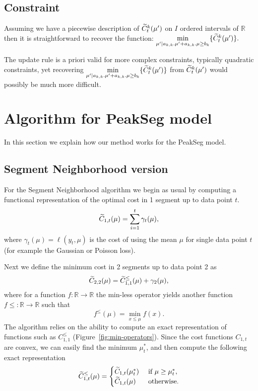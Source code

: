 \documentclass{article}
\newcommand{\RR}{\mathbb R}
\begin{document}
\subsection{Constraint}
Assuming we have a piecewise description of $\widetilde{C}^{k}_{t}(\mu')$ on $I$ ordered intervals of $\mathbb{R}$
then it is straightforward to recover the function:
$\underset{\mu' | a_{k,k}. \mu' + a_{k,k}. \mu  \geq  b_{k}}{\min} \{ \widetilde{C}^{k}_{t}(\mu') \}.$

The update rule is a priori valid for more complex constraints, typically quadratic constraints, yet recovering
$\underset{\mu' | a_{k,k}. \mu' + a_{k,k}. \mu  \geq  b_{k}}{\min} \{ \widetilde{C}^{k}_{t}(\mu') \}$ from $\widetilde{C}^{k}_{t}(\mu')$ would possibly be much more difficult.


\section{Algorithm for PeakSeg model}

In this section we explain how our method works for the PeakSeg model.

\subsection{Segment Neighborhood version}

For the Segment Neighborhood algorithm we begin as usual by computing
a functional representation of the optimal cost in 1 segment up to
data point $t$. 
\begin{equation*}
  \label{eq:C1b}
  \widetilde{C}_{1,t}(\mu) = \sum_{i=1}^t \gamma_t(\mu),
\end{equation*}
where $\gamma_t(\mu)=\ell(y_t, \mu)$ is the cost of using the mean
$\mu$ for single data point $t$ (for example the Gaussian or Poisson
loss).

Next we define the minimum cost in 2 segments up to data point 2 as
\begin{equation*}
  \label{eq:C22}
  \widetilde{C}_{2,2}(\mu) = \widetilde{C}_{1,1}^{\leq}(\mu) + \gamma_2(\mu),
\end{equation*}
where for a function $f:\RR\rightarrow\RR$ the min-less operator
yields another function $f\leq:\RR\rightarrow\RR$ such that
\begin{equation}
  \label{eq:min-less}
  f^{\leq}(\mu) = \min_{x\leq \mu} f(x).
\end{equation}
The algorithm relies on the ability to compute an exact representation
of functions such as $C_{1,1}^{\leq}$
(Figure~\ref{fig:min-operators}). Since the cost functions $C_{1,t}$
are convex, we can easily find the minimum $\mu_t^*$, and then compute
the following exact representation
\begin{equation*}
  \widetilde{C}_{1,t}^\leq(\mu)=
  \begin{cases}
    \widetilde{C}_{1,t}(\mu_t^*) & \text{ if } \mu \geq \mu_t^*,\\
    \widetilde{C}_{1,t}(\mu) & \text{ otherwise.}
  \end{cases}
\end{equation*}
\end{document}
